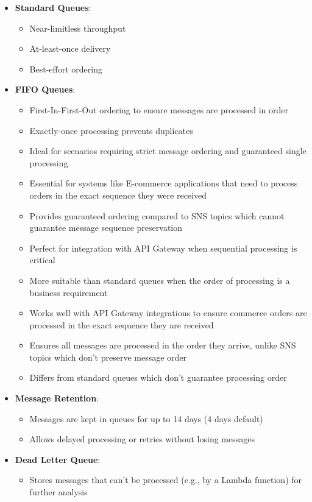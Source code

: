 \documentclass[11pt,a4paper]{report}
\begin{document}
\begin{itemize}
  \item \textbf{Standard Queues}:
\begin{itemize}
  \item Near-limitless throughput
  \item At-least-once delivery
  \item Best-effort ordering
\end{itemize}
  \item \textbf{FIFO Queues}:
\begin{itemize}
  \item First-In-First-Out ordering to ensure messages are processed in order
  \item Exactly-once processing prevents duplicates
  \item Ideal for scenarios requiring strict message ordering and guaranteed single processing
  \item Essential for systems like E-commerce applications that need to process orders in the exact sequence they were received
  \item Provides guaranteed ordering compared to SNS topics which cannot guarantee message sequence preservation
  \item Perfect for integration with API Gateway when sequential processing is critical
  \item More suitable than standard queues when the order of processing is a business requirement
  \item Works well with API Gateway integrations to ensure commerce orders are processed in the exact sequence they are received
  \item Ensures all messages are processed in the order they arrive, unlike SNS topics which don't preserve message order
  \item Differs from standard queues which don't guarantee processing order
\end{itemize}
  \item \textbf{Message Retention}:
\begin{itemize}
  \item Messages are kept in queues for up to 14 days (4 days default)
  \item Allows delayed processing or retries without losing messages
\end{itemize}
  \item \textbf{Dead Letter Queue}:
\begin{itemize}
  \item Stores messages that can't be processed (e.g., by a Lambda function) for further analysis

\end{itemize}
\end{itemize}
\end{document}
